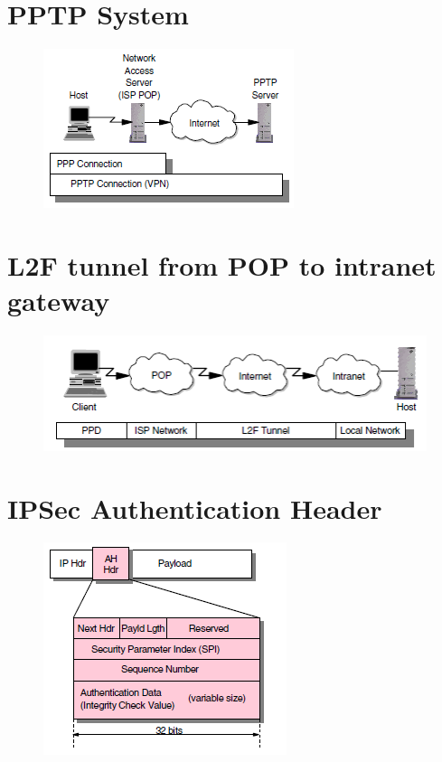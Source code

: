 \documentclass[10pt,a4paper]{article}
\begin{document}
\newpage
\section{PPTP System}

\begin{figure}[hbtp]
\centering
\includegraphics[scale=1]{PPTP system.png}
\end{figure}

\newpage
\section{L2F tunnel from POP to intranet gateway}

\begin{figure}[hbtp]
\centering
\includegraphics[scale=1]{L2F tunnel from POP to intranet gateway.png}
\end{figure}

\newpage
\section{IPSec Authentication Header}

\begin{figure}[hbtp]
\centering
\includegraphics[scale=1]{IPSecAH.png}
\end{figure}
\end{document}
